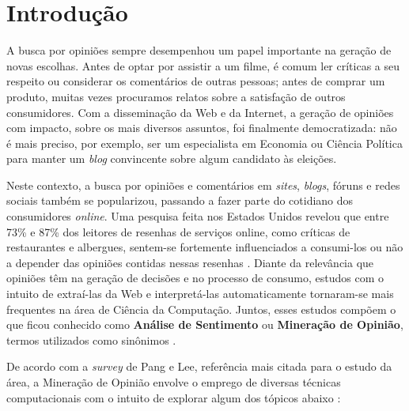 \chapter{Introdução}


A busca por opiniões sempre desempenhou um papel importante na geração de novas escolhas. Antes de optar por assistir a um filme, é comum ler críticas a seu respeito ou considerar os comentários de outras pessoas; antes de comprar um produto, muitas vezes procuramos relatos sobre a satisfação de outros consumidores. Com a disseminação da Web e da Internet, a geração de opiniões com impacto, sobre os mais diversos assuntos, foi finalmente democratizada: não é mais preciso, por exemplo, ser um especialista em Economia ou Ciência Política para manter um \emph{blog} convincente sobre algum candidato às eleições.

Neste contexto, a busca por opiniões e comentários em \emph{sites}, \emph{blogs}, fóruns e redes sociais também se popularizou, passando a fazer parte do cotidiano dos consumidores \emph{online}. Uma pesquisa feita nos Estados Unidos revelou que entre 73\% e 87\% dos leitores de resenhas de serviços online, como críticas de restaurantes e albergues, sentem-se fortemente influenciados a consumi-los ou não a depender das opiniões contidas nessas resenhas \cite{pesquisa-eua}. Diante da relevância que opiniões têm na geração de decisões e no processo de consumo, estudos com o intuito de extraí-las da Web e interpretá-las automaticamente tornaram-se mais frequentes na área de Ciência da Computação. Juntos, esses estudos compõem o que ficou conhecido como \textbf{Análise de Sentimento} ou \textbf{Mineração de Opinião}, termos utilizados como sinônimos \cite{omsa} \cite{bingliu}.

De acordo com a \emph{survey} de Pang e Lee, referência mais citada para o estudo da área, a Mineração de Opinião envolve o emprego de diversas técnicas computacionais com o intuito de explorar algum dos tópicos abaixo \cite{omsa}:

